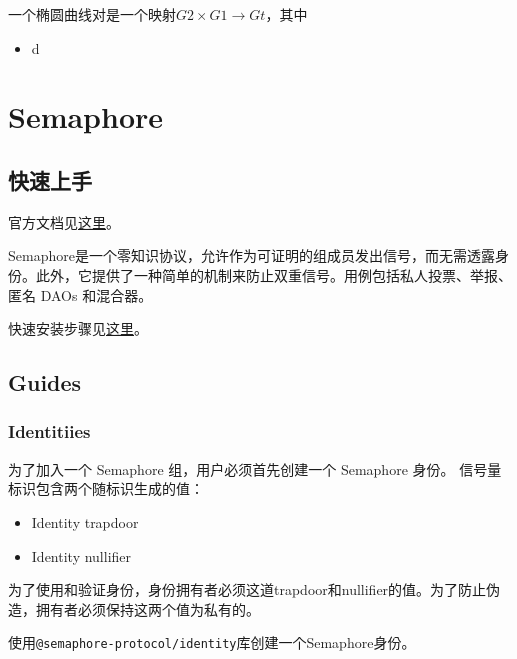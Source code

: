 \documentclass[10pt]{ctexart}
\begin{document}
一个椭圆曲线对是一个映射$G2 \times G1 \rightarrow Gt$，其中
\begin{itemize}
	\item d
\end{itemize}

\section{Semaphore}
\subsection{快速上手}
官方文档见\href{https://semaphore.appliedzkp.org/}{这里}。

Semaphore是一个零知识协议，允许作为可证明的组成员发出信号，而无需透露身份。此外，它提供了一种简单的机制来防止双重信号。用例包括私人投票、举报、匿名 DAOs 和混合器。

快速安装步骤见\href{https://semaphore.appliedzkp.org/docs/quick-setup}{这里}。
\subsection{Guides}
\subsubsection{Identitiies}
为了加入一个 Semaphore 组，用户必须首先创建一个 Semaphore 身份。 信号量标识包含两个随标识生成的值：
\begin{itemize}
	\item Identity trapdoor
	\item Identity nullifier
\end{itemize}
为了使用和验证身份，身份拥有者必须这道trapdoor和nullifier的值。为了防止伪造，拥有者必须保持这两个值为私有的。

使用\verb|@semaphore-protocol/identity|库创建一个Semaphore身份。
\end{document}
